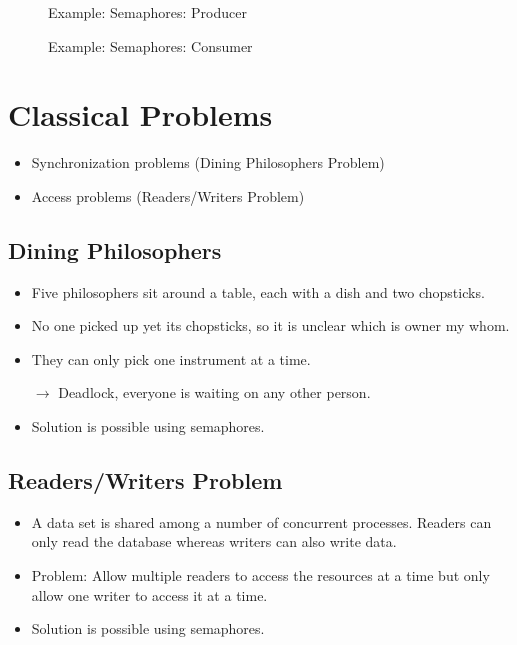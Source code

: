 				\begin{figure}[H]
					\centering
					
					\caption{Example: Semaphores: Producer}
				\end{figure}

				\begin{figure}[H]
					\centering
					
					\caption{Example: Semaphores: Consumer}
				\end{figure}

	\section{Classical Problems}
		\begin{itemize}
			\item Synchronization problems (Dining Philosophers Problem)
			\item Access problems (Readers/Writers Problem)
		\end{itemize}

		\subsection{Dining Philosophers}
			\begin{itemize}
				\item Five philosophers sit around a table, each with a dish and two chopsticks.
				\item No one picked up yet its chopsticks, so it is unclear which is owner my whom.
				\item They can only pick one instrument at a time.
				\item[\(\rightarrow\)] Deadlock, everyone is waiting on any other person.
				\item Solution is possible using semaphores.
			\end{itemize}


		\subsection{Readers/Writers Problem}
			\begin{itemize}
				\item A data set is shared among a number of concurrent processes. Readers can only read the database whereas writers can also write data.
				\item Problem: Allow multiple readers to access the resources at a time but only allow one writer to access it at a time.
				\item Solution is possible using semaphores.
			\end{itemize}

